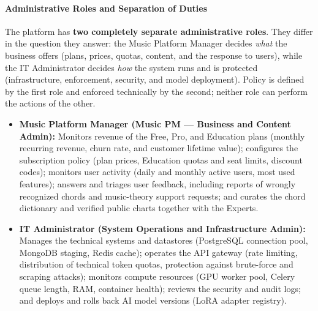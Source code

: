 \documentclass[a4paper]{article}
\begin{document}
\paragraph{Administrative Roles and Separation of Duties}

The platform has \textbf{two completely separate administrative roles}. They differ in the question they answer: the Music Platform Manager decides \emph{what} the business offers (plans, prices, quotas, content, and the response to users), while the IT Administrator decides \emph{how} the system runs and is protected (infrastructure, enforcement, security, and model deployment). Policy is defined by the first role and enforced technically by the second; neither role can perform the actions of the other.

\begin{itemize}
    \item \textbf{Music Platform Manager (Music PM --- Business and Content Admin):} Monitors revenue of the Free, Pro, and Education plans (monthly recurring revenue, churn rate, and customer lifetime value); configures the subscription policy (plan prices, Education quotas and seat limits, discount codes); monitors user activity (daily and monthly active users, most used features); answers and triages user feedback, including reports of wrongly recognized chords and music-theory support requests; and curates the chord dictionary and verified public charts together with the Experts.
    \item \textbf{IT Administrator (System Operations and Infrastructure Admin):} Manages the technical systems and datastores (PostgreSQL connection pool, MongoDB staging, Redis cache); operates the API gateway (rate limiting, distribution of technical token quotas, protection against brute-force and scraping attacks); monitors compute resources (GPU worker pool, Celery queue length, RAM, container health); reviews the security and audit logs; and deploys and rolls back AI model versions (LoRA adapter registry).
\end{itemize}
\end{document}
